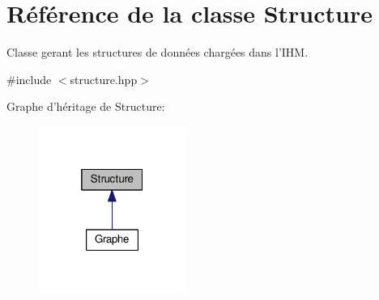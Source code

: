 \hypertarget{classStructure}{\section{Référence de la classe Structure}
\label{classStructure}
}


Classe gerant les structures de données chargées dans l'I\+H\+M.  




{\ttfamily \#include $<$structure.\+hpp$>$}



Graphe d'héritage de Structure\+:\nopagebreak
\begin{figure}[H]
\begin{center}
\leavevmode
\includegraphics[width=136pt]{classStructure__inherit__graph}
\end{center}
\end{figure}
